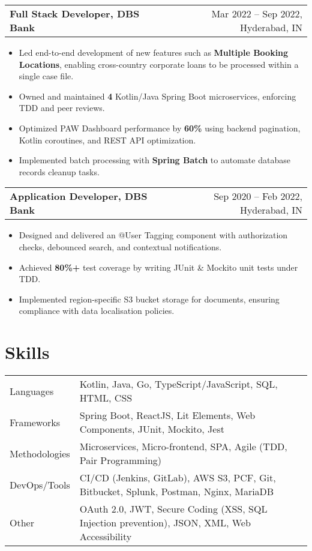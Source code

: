 \documentclass[a4paper,12pt]{article}
\makeatletter
\newenvironment{joblong}[2]
    {
    \begin{tabularx}{\linewidth}{@{}l X r@{}}
    \textbf{#1} & &  #2 \\
    \end{tabularx}
    \begin{minipage}[t]{\linewidth}
    \begin{itemize}[nosep,after=\strut, leftmargin=1em, itemsep=3pt,label=--]
    }
    {
    \end{itemize}
    \end{minipage}    
    }
\makeatother
\begin{document}
\begin{joblong}{Full Stack Developer, DBS Bank}{Mar 2022 -- Sep 2022, Hyderabad, IN}
\item Led end-to-end development of new features such as \textbf{Multiple Booking Locations}, enabling cross-country corporate loans to be processed within a single case file.
\item Owned and maintained \textbf{4} Kotlin/Java Spring Boot microservices, enforcing TDD and peer reviews.
\item Optimized PAW Dashboard performance by \textbf{60\%} using backend pagination, Kotlin coroutines, and REST API optimization.
\item Implemented batch processing with \textbf{Spring Batch} to automate database records cleanup tasks.
\end{joblong}

\begin{joblong}{Application Developer, DBS Bank}{Sep 2020 -- Feb 2022, Hyderabad, IN}
\item Designed and delivered an @User Tagging component with authorization checks, debounced search, and contextual notifications.
\item Achieved \textbf{80\%+} test coverage by writing JUnit \& Mockito unit tests under TDD.
\item Implemented region-specific S3 bucket storage for documents, ensuring compliance with data localisation policies.
\end{joblong}
\section{Skills}
\begin{tabularx}{\linewidth}{@{}l X@{}}
Languages & Kotlin, Java, Go, TypeScript/JavaScript, SQL, HTML, CSS \\
Frameworks & Spring Boot, ReactJS, Lit Elements, Web Components, JUnit, Mockito, Jest \\
Methodologies &  Microservices, Micro-frontend, SPA, Agile (TDD, Pair Programming) \\
DevOps/Tools &  CI/CD (Jenkins, GitLab), AWS S3, PCF, Git, Bitbucket, Splunk, Postman, Nginx, MariaDB \\
Other & OAuth 2.0, JWT, Secure Coding (XSS, SQL Injection prevention), JSON, XML, Web Accessibility \\
\end{tabularx}
\end{document}
